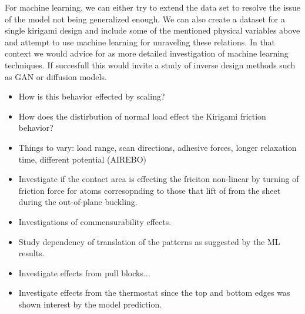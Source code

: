 For machine learning, we can either try to extend the data set to resolve the issue of the model not being generalized enough. We can also create a dataset for a single kirigami design and include some of the mentioned physical variables above and attempt to use machine learning for unraveling these relations. In that context we would advice for as more detailed investigation of machine learning techniques. If succesfull this would invite a study of inverse design methods such as GAN or diffusion models. 

\begin{itemize}
  \item How is this behavior effected by scaling?
  \item How does the distirbution of normal load effect the Kirigami friction behavior?
  \item Things to vary: load range, scan directions, adhesive forces, longer relaxation time, different potential (AIREBO)
  \item Investigate if the contact area is effecting the friciton non-linear by turning of friction force for atoms corresopnding to those that lift of from the sheet during the out-of-plane buckling. 
  \item Investigations of commensurability effects.
  \item Study dependency of translation of the patterns as suggested by the ML results. 
  \item Investigate effects from pull blocks...
  \item Investigate effects from the thermostat since the top and bottom edges was shown interest by the model prediction.
\end{itemize}


